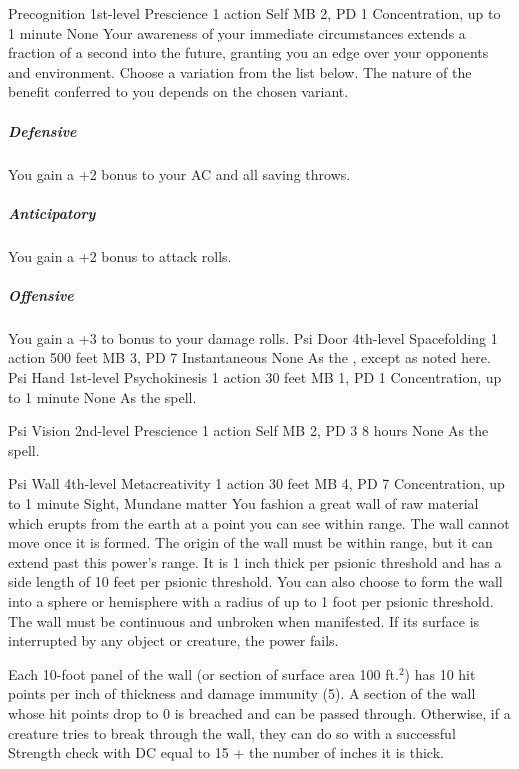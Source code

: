 \DndPowerHeader%
    {Precognition\label{pwr:precognition}}
    {1st-level Prescience}
    {1 action}
    {Self}
    {MB 2, PD 1}
    {Concentration, up to 1 minute}
    {None}
Your awareness of your immediate circumstances extends
a fraction of a second into the future,
granting you an edge over your opponents and environment.
Choose a variation from the list below.
The nature of the benefit conferred to you
depends on the chosen variant.

\subparagraph{Defensive}
  You gain a +2 bonus to your AC and all saving throws.

\subparagraph{Anticipatory}
  You gain a +2 bonus to attack rolls.

\subparagraph{Offensive}
  You gain a +3 to bonus to your damage rolls.
\DndPowerHeader%
    {Psi Door\label{pwr:psi_door}}
    {4th-level Spacefolding}
    {1 action}
    {500 feet}
    {MB 3, PD 7}
    {Instantaneous}
    {None}
As the , except as
noted here.
\DndPowerHeader%
    {Psi Hand\label{pwr:psi_hand}}
    {1st-level Psychokinesis}
    {1 action}
    {30 feet}
    {MB 1, PD 1}
    {Concentration, up to 1 minute}
    {None}
As the  spell.

\DndPowerHeader%
    {Psi Vision\label{pwr:psi_vision}}
    {2nd-level Prescience}
    {1 action}
    {Self}
    {MB 2, PD 3}
    {8 hours}
    {None}
As the  spell.

\DndPowerHeader%
    {Psi Wall\label{pwr:psi_wall}}
    {4th-level Metacreativity}
    {1 action}
    {30 feet}
    {MB 4, PD 7}
    {Concentration, up to 1 minute}
    {Sight, Mundane matter}
You fashion a great wall of raw material
which erupts from the earth at a point you can see within
range. The wall cannot move once it is formed. The origin
of the wall must be within range, but it can extend past this
power's range. It is 1 inch thick per psionic threshold and
has a side length of 10 feet per psionic threshold. You can
also choose to form the wall into a sphere or hemisphere with
a radius of up to 1 foot per psionic threshold. The wall must
be continuous and unbroken when manifested. If its surface
is interrupted by any object or creature, the power fails.

Each 10-foot panel of the wall (or section of surface area
100 ft.$^2$) has 10 hit points per inch of thickness and damage
immunity (5). A section of the wall whose hit points drop
to 0 is breached and can be passed through. Otherwise, if
a creature tries to break through the wall, they can do so
with a successful Strength check with DC equal to 15 + the
number of inches it is thick.

